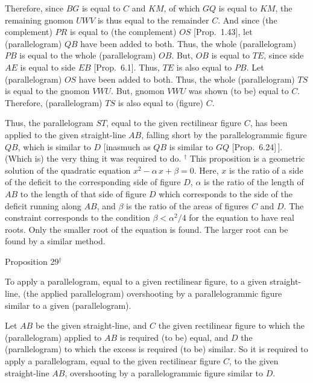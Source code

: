 Therefore, since $BG$ is equal to $C$ and $KM$, of which $GQ$ is equal
to $KM$, the remaining gnomon $UWV$ is thus equal to the remainder $C$. 
And since (the complement) $PR$ is equal to (the complement) $OS$  [Prop.~1.43], let (parallelogram) $QB$ have been added to both. Thus, the whole
(parallelogram) $PB$ is equal to the whole (parallelogram) $OB$. But,
$OB$ is equal to $TE$, since side $AE$ is equal to side $EB$ [Prop.~6.1]. Thus, $TE$ is also equal to $PB$. 
Let (parallelogram) $OS$ have been added to both. Thus, the whole (parallelogram) $TS$ is equal to the gnomon $VWU$. But, gnomon $VWU$ was shown (to be)
equal to $C$.  Therefore, (parallelogram) $TS$ is also equal to (figure) $C$.

Thus, the parallelogram $ST$, equal to the given rectilinear figure
$C$, has been applied to the given straight-line $AB$, falling
short by the parallelogrammic figure $QB$, which is similar to $D$ [inasmuch as
$QB$ is similar to $GQ$ [Prop.~6.24]\,]. 
(Which is) the very thing it was required to do.
{\footnotesize\noindent$^\dag$ This proposition is a geometric
solution of the quadratic equation $x^2 - \alpha\,x +\beta = 0$. Here,
$x$ is the ratio of a side of the deficit to the corresponding side of figure $D$, $\alpha$
is the ratio of the length of $AB$ to the length of that side of figure $D$ which corresponds to the side of the deficit running along $AB$, and $\beta$ is the
ratio of the areas of figures $C$ and $D$. The constraint corresponds to the
condition $\beta < \alpha^2/4$ for the equation to have real roots. Only the
smaller root of the equation is found. The larger root can be found by a
similar method.}


\begin{center}
{\large Proposition 29}$^\dag$
\end{center}

To apply a parallelogram, equal to a given
rectilinear figure,  to a given
straight-line, (the applied parallelogram) overshooting by a parallelogrammic figure similar to a given (parallelogram).

\epsfysize=1.8in
\centerline{}

Let $AB$ be the given straight-line, and $C$ the given rectilinear figure to which the (parallelogram) applied to $AB$ is required (to be) equal, and $D$ the (parallelogram) to which the excess is required (to be) similar. So
it is required to apply a parallelogram, equal to the given rectilinear figure
$C$, to the given straight-line $AB$, overshooting by a parallelogrammic
figure  similar to $D$.


